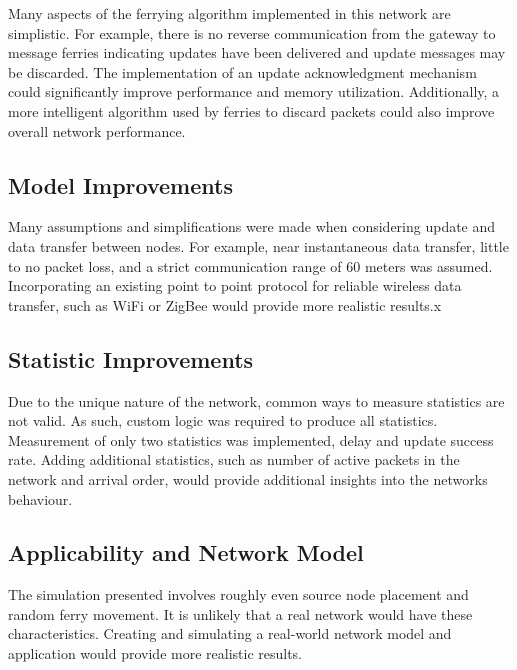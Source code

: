 Many aspects of the ferrying algorithm implemented in this network are simplistic.
For example, there is no reverse communication from the gateway to message ferries indicating updates have been delivered and update messages may be discarded.
The implementation of an update acknowledgment mechanism could significantly improve performance and memory utilization.
Additionally, a more intelligent algorithm used by ferries to discard packets could also improve overall network performance.

\subsection{Model Improvements}

Many assumptions and simplifications were made when considering update and data transfer between nodes.
For example, near instantaneous data transfer, little to no packet loss, and a strict communication range of 60 meters was assumed.
Incorporating an existing point to point protocol for reliable wireless data transfer, such as WiFi or ZigBee would provide more realistic results.x

\subsection{Statistic Improvements}

Due to the unique nature of the network, common ways to measure statistics are not valid.
As such, custom logic was required to produce all statistics.
Measurement of only two statistics was implemented, delay and update success rate.
Adding additional statistics, such as number of active packets in the network and arrival order, would provide additional insights into the networks behaviour.

\subsection{Applicability and Network Model}

The simulation presented involves roughly even source node placement and random ferry movement.
It is unlikely that a real %
network would have these characteristics.
Creating and simulating a real-world network model and application would provide more realistic results.
